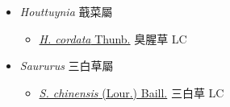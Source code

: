 
  \begin{itemize}
 \item[] \textit{Houttuynia} 蕺菜屬
                    
  \begin{itemize}
        \item[] \href{http://www.theplantlist.org/tpl1.1/search?q=Houttuynia+cordata}{\textit{H. cordata} Thunb.}   臭腥草 LC
  \end{itemize}
 \item[] \textit{Saururus} 三白草屬
                    
  \begin{itemize}
        \item[] \href{http://www.theplantlist.org/tpl1.1/search?q=Saururus+chinensis}{\textit{S. chinensis} (Lour.) Baill.}   三白草 LC
  \end{itemize}
  \end{itemize}

